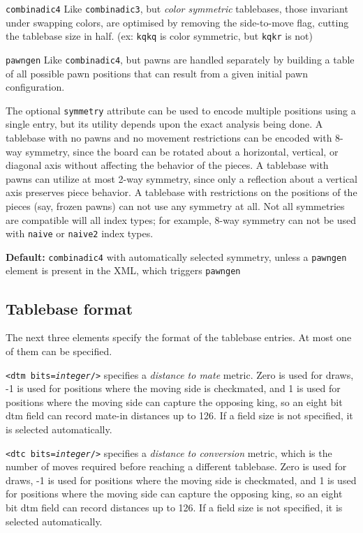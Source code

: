 \documentclass[11pt]{article}
\begin{document}
\begin{description}
\item {\tt combinadic4} Like {\tt combinadic3}, but {\it color
  symmetric} tablebases, those invariant under swapping colors,
  are optimised by removing the side-to-move flag, cutting the
  tablebase size in half.  (ex: {\tt kqkq} is color symmetric,
  but {\tt kqkr} is not)

\item {\tt pawngen} Like {\tt combinadic4}, but pawns are handled
  separately by building a table of all possible pawn positions that
  can result from a given initial pawn configuration.

\end{description}

The optional {\tt symmetry} attribute can be used to encode multiple
positions using a single entry, but its utility depends upon the exact
analysis being done.  A tablebase with no pawns and no movement
restrictions can be encoded with 8-way symmetry,
since the board can be rotated about a horizontal, vertical, or
diagonal axis without affecting the behavior of the pieces.  A
tablebase with pawns can utilize at most 2-way
symmetry, since only a reflection about a vertical axis preserves
piece behavior.  A tablebase with restrictions on the positions of the
pieces (say, frozen pawns) can not use any symmetry at all.
Not all symmetries are compatible will all index types; for example,
8-way symmetry can not be used with {\tt naive} or {\tt naive2}
index types.

{\bf Default:} {\tt combinadic4} with automatically selected symmetry,
unless a {\tt pawngen} element is present in the XML, which triggers
{\tt pawngen}

\subsection{Tablebase format}

The next three elements specify the format of the tablebase entries.
At most one of them can be specified.

{\tt <dtm bits={\it integer}/>} specifies a {\it distance to mate}
metric.  Zero is used for draws, -1 is used for positions where the
moving side is checkmated, and 1 is used for positions where the
moving side can capture the opposing king, so an eight bit dtm field
can record mate-in distances up to 126.  If a field size is not
specified, it is selected automatically.

{\tt <dtc bits={\it integer}/>} specifies a {\it distance to
  conversion} metric, which is the number of moves required before
reaching a different tablebase.  Zero is used for draws, -1 is used
for positions where the moving side is checkmated, and 1 is used for
positions where the moving side can capture the opposing king, so an
eight bit dtm field can record distances up to 126.  If a field size
is not specified, it is selected automatically.
\end{document}
